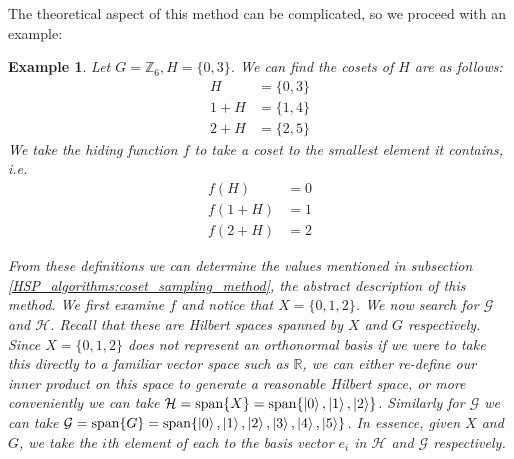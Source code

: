 \documentclass{article}
\renewcommand{\ket}{\Ket}
\theoremstyle{plain}
\theoremstyle{centered}
\newtheorem{example}{Example}
\renewcommand{\ket}{\Ket}
\newcommand{\vspan}[1]{\textnormal{span}\{#1\}}
\newcommand{\bb}[1]{\mathbb{#1}}
\renewcommand{\cal}[1]{\mathcal{#1}}
\begin{document}
        The theoretical aspect of this method can be complicated, so we proceed with an example:
        \begin{example}\label{ex:coset_sampling_method}
            Let $G = \bb{Z}_6, H = \{0, 3\}$. We can find the cosets of $H$ are as follows:
            \begin{align*}
                H &= \{0, 3\}\\
                1 + H &= \{1, 4\}\\
                2 + H &= \{2, 5\}
            \end{align*}
            We take the hiding function $f$ to take a coset to the smallest element it contains, i.e. 
            \begin{align*}
                f(H) &= 0\\
                f(1 + H) &= 1\\
                f(2 + H) &= 2
            \end{align*}

            From these definitions we can determine the values mentioned in subsection \cref{HSP_algorithms:coset_sampling_method}, the abstract description of this method.
            We first examine $f$ and notice that $X = \{0, 1, 2\}$.
            We now search for $\cal{G}$ and $\cal{H}$.
            Recall that these are Hilbert spaces spanned by $X$ and $G$ respectively.
            Since $X = \{0, 1, 2\}$ does not represent an orthonormal basis if we were to take this directly to a familiar vector space such as $\bb{R}$, we can either re-define our inner product on this space to generate a reasonable Hilbert space, or more conveniently we can take $\cal{H} = \vspan{X} = \vspan{\ket{0}, \ket{1}, \ket{2}}$.
            Similarly for $\cal{G}$ we can take $\cal{G} = \vspan{G} = \vspan{\ket{0}, \ket{1}, \ket{2}, \ket{3}, \ket{4}, \ket{5}}$.
            In essence, given $X$ and $G$, we take the $i$th element of each to the basis vector $e_i$ in $\cal{H}$ and $\cal{G}$ respectively.
    

\end{example}
\end{document}
